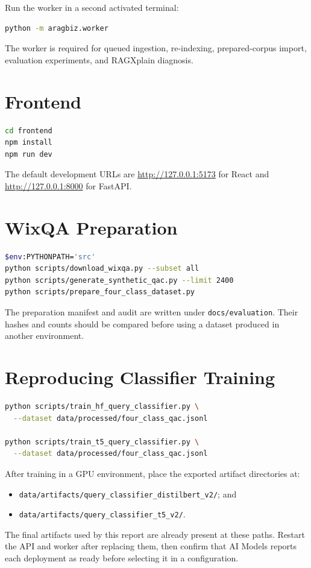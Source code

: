 Run the worker in a second activated terminal:

\begin{lstlisting}[language=bash]
python -m aragbiz.worker
\end{lstlisting}

The worker is required for queued ingestion, re-indexing, prepared-corpus
import, evaluation experiments, and RAGXplain diagnosis.

\section{Frontend}

\begin{lstlisting}[language=bash,caption={Starting the React studio.}]
cd frontend
npm install
npm run dev
\end{lstlisting}

The default development URLs are
\url{http://127.0.0.1:5173} for React and
\url{http://127.0.0.1:8000} for FastAPI.

\section{WixQA Preparation}

\begin{lstlisting}[language=bash,caption={Preparing WixQA and the classifier dataset.}]
$env:PYTHONPATH='src'
python scripts/download_wixqa.py --subset all
python scripts/generate_synthetic_qac.py --limit 2400
python scripts/prepare_four_class_dataset.py
\end{lstlisting}

The preparation manifest and audit are written under
\texttt{docs/evaluation}. Their hashes and counts should be compared before
using a dataset produced in another environment.

\section{Reproducing Classifier Training}

\begin{lstlisting}[language=bash,caption={Four-class model training commands.}]
python scripts/train_hf_query_classifier.py \
  --dataset data/processed/four_class_qac.jsonl

python scripts/train_t5_query_classifier.py \
  --dataset data/processed/four_class_qac.jsonl
\end{lstlisting}

After training in a GPU environment, place the exported artifact directories
at:

\begin{itemize}
  \item \texttt{data/artifacts/query\_classifier\_distilbert\_v2/}; and
  \item \texttt{data/artifacts/query\_classifier\_t5\_v2/}.
\end{itemize}

The final artifacts used by this report are already present at these paths.
Restart the API and worker after replacing them, then confirm that AI Models
reports each deployment as ready before selecting it in a configuration.
